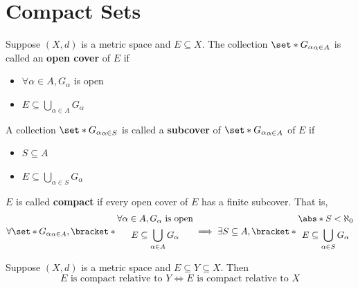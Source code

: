 \section{Compact Sets}

\begin{definition} \label{an:def:open-cover-compactness}
  Suppose $(X, d)$ is a metric space and $E \subseteq X$. The collection
  $\set*{G_{\alpha}}_{\alpha \in A}$ is called an \textbf{open cover} of $E$ if
  \begin{itemize}
    \item $\forall \alpha \in A, G_{\alpha}$ is open
    \item $E \subseteq \bigcup_{\alpha \in A} G_{\alpha}$
  \end{itemize}
  A collection $\set*{G_{\alpha}}_{\alpha \in S}$ is called a \textbf{subcover} of $\set*{G_{\alpha}}_{\alpha \in A}$ of $E$ if
  \begin{itemize}
    \item $S \subseteq A$
    \item $E \subseteq \bigcup_{\alpha \in S} G_{\alpha}$
  \end{itemize}
  $E$ is called \textbf{compact} if every open cover of $E$ has a finite subcover. That is,
  \[
    \forall \set*{G_{\alpha}}_{\alpha \in A},
    \bracket*{\begin{gathered}
        \forall \alpha \in A, G_{\alpha} \text{ is open} \\
        E \subseteq \bigcup_{\alpha \in A} G_{\alpha}
      \end{gathered}}
    \implies \exists S \subseteq A,
    \bracket*{\begin{gathered}
        \abs*{S} < \aleph_{0} \\
        E \subseteq \bigcup_{\alpha \in S} G_{\alpha}
      \end{gathered}}
  \]

\end{definition}

\bigskip

\begin{theorem} \label{an:thm:compactness-preserved-under-subspace}
  Suppose $(X, d)$ is a metric space and $E \subseteq Y \subseteq X$. Then
  \[
    E \text{ is compact relative to } Y \iff E \text{ is compact relative to } X
  \]
\end{theorem}

